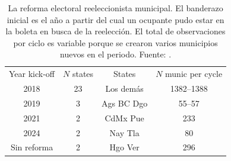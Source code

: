 \documentclass[letter,12pt]{article}
\begin{document}

\begin{table}
  \centering
  \begin{tabular}{cccc}
    Year kick-off &  $N$ states &  States & $N$ munic per cycle   \\
    2018            &          23 & Los demás  &               1382--1388 \\
    2019            &           3 & Ags BC Dgo &                   55--57 \\
    2021            &           2 & CdMx Pue   &                      233 \\
    2024            &           2 & Nay Tla    &                       80 \\
    Sin reforma     &           2 & Hgo Ver    &                      296 \\ \hline
  \end{tabular}
  \caption{La reforma electoral reeleccionista municipal. El banderazo inicial es el año a partir del cual un ocupante pudo estar en la boleta en busca de la reelección. El total de observaciones por ciclo es variable porque se crearon varios municipios nuevos en el periodo. Fuente: \citet{magar.el.dataset.2026}.}\label{T:reel}
\end{table}
\end{document}
